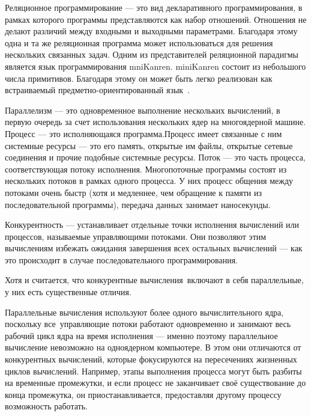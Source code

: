 

Реляционное программирование --- это вид декларативного программирования, в рамках которого программы представляются как набор
отношений. Отношения не делают различий между входными и выходными параметрами. Благодаря этому одна и та же реляционная
программа может использоваться для решения нескольких связанных
задач. Одним из представителей реляционной парадигмы является
язык программирования mniKanren. miniKanren состоит из небольшого числа примитивов. Благодаря этому он может быть легко реализован как встраиваемый предметно-ориентированный язык~\cite{moiseenko_podkopaev}. 


Параллелизм --- это одновременное выполнение нескольких вычислений, в первую очередь за счет использования нескольких ядер на многоядерной машине.  
Процесс --- это исполняющаяся программа.Процесс имеет связанные с ним системные ресурсы --- это его память, открытые им файлы, открытые сетевые соединения и прочие подобные системные ресурсы.
Поток --- это часть процесса, соответствующая потоку исполнения.
Многопоточные программы состоят из нескольких потоков в рамках одного процесса. 
У них процесс общения между потоками очень быстр 
(хотя и медленнее, чем обращение к памяти из последовательной программы), 
передача данных занимает наносекунды. 

Конкурентность ---  устанавливает 
отдельные точки исполнения вычислений или процессов, 
называемые управляющими потоками. Они позволяют этим вычислениям избежать ожидания завершения всех 
остальных вычислений --- как это происходит в случае последовательного программирования.

Хотя и считается, что конкурентные вычисления включают в себя параллельные, у них есть существенные отличия.

Параллельные вычисления используют более одного вычислительного ядра, поскольку все управляющие потоки работают одновременно и 
занимают весь рабочий цикл ядра на время исполнения — именно поэтому параллельное вычисление невозможно на одноядерном компьютере. 
В этом они отличаются от конкурентных вычислений, которые фокусируются на пересечениях жизненных циклов вычислений. 
Например, этапы выполнения процесса могут быть разбиты на временные промежутки, и если процесс не заканчивает своё существование 
до конца промежутка, он приостанавливается, предоставляя другому процессу возможность работать.

